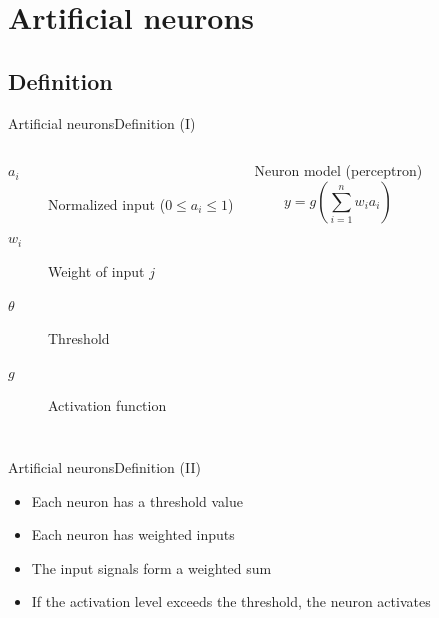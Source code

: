 \documentclass[10pt,compress]{beamer} %
\begin{document}
\section{Artificial neurons}

\subsection{Definition}

\begin{frame}{Artificial neurons}{Definition (I)}

    

	\bigskip
    \begin{columns}
		\begin{description}
		\item[$a_i$] Normalized input ($0 \le a_i \le 1$)
		\item[$w_{i}$] Weight of input $j$
		\item[$\theta$] Threshold
		\item[$g$] Activation function
		\end{description}

	   \begin{block}{Neuron model (perceptron)}
	   \vspace{-0.5cm}
	   \begin{equation*}
	   y=g\left( \sum_{i=1}^n w_{i} a_i \right)
	   \end{equation*}
	   \end{block}
    \end{columns}
\end{frame}

\begin{frame}{Artificial neurons}{Definition (II)}
	\begin{itemize}
	\item Each neuron has a threshold value
	\item Each neuron has weighted inputs
	\item The input signals form a weighted sum
	\item If the activation level exceeds the threshold, the neuron activates
	\end{itemize}
\end{frame}
\end{document}
